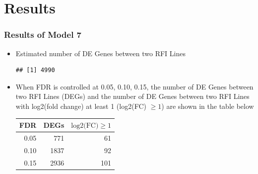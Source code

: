 \documentclass[handout,xcolor=pdftex,dvipsnames,table]{beamer}\usepackage[]{graphicx}\usepackage[]{color}
\makeatletter
\newenvironment{kframe}{%
 \def\at@end@of@kframe{}%
 \ifinner\ifhmode%
  \def\at@end@of@kframe{\end{minipage}}%
  \begin{minipage}{\columnwidth}%
 \fi\fi%
 \def\FrameCommand##1{\hskip\@totalleftmargin \hskip-\fboxsep
 \colorbox{shadecolor}{##1}\hskip-\fboxsep
     \hskip-\linewidth \hskip-\@totalleftmargin \hskip\columnwidth}%
 \MakeFramed {\advance\hsize-\width
   \@totalleftmargin\z@ \linewidth\hsize
   \@setminipage}}%
 {\par\unskip\endMakeFramed%
 \at@end@of@kframe}
\newenvironment{knitrout}{}{} %
\makeatother
\begin{document}
\section{Results}
\begin{frame}[fragile]
\frametitle{Results of Model 7}
\begin{itemize}
\item 
Estimated number of DE Genes between two RFI Lines
\begin{knitrout}\footnotesize
{}\color{fgcolor}\begin{kframe}
\begin{verbatim}
## [1] 4990
\end{verbatim}
\end{kframe}
\end{knitrout}


\item When FDR is controlled at 0.05, 0.10, 0.15, the number of DE Genes between two RFI Lines (DEGs) and the number of DE Genes between two RFI Lines with log2(fold change) at least 1 (log2(FC) $\geq 1$) are shown in the table below
\begin{table}[ht]
\centering
\begin{tabular}{rrr}
  \hline
FDR & DEGs & $\mbox{log2(FC)}\geq 1$ \\ 
  \hline
0.05 & 771 &  61 \\ 
  0.10 & 1837 &  92 \\ 
  0.15 & 2936 & 101 \\ 
   \hline
\end{tabular}
\end{table}


\end{itemize}
\end{frame}
\end{document}
